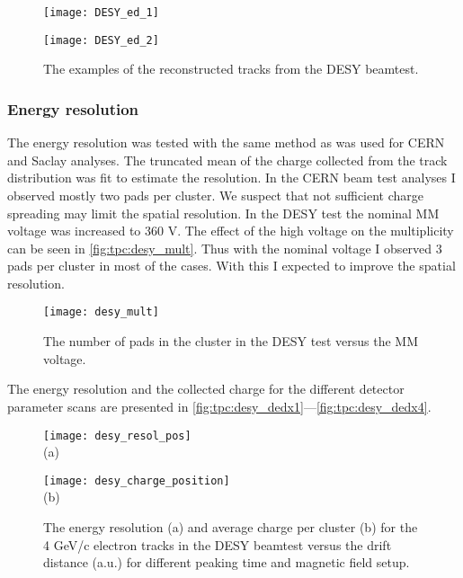 \documentclass[../main.tex]{subfiles}
\begin{document}
\begin{figure}[!ht]
  \centering
  \begin{minipage}{0.49\linewidth}
    \centering
    \texttt{[image: DESY\_ed\_1]}
  \end{minipage}
  \begin{minipage}{0.49\linewidth}
    \centering
    \texttt{[image: DESY\_ed\_2]}
  \end{minipage}
  \caption{The examples of the reconstructed tracks from the DESY beamtest.}
  \label{fig:tpc:desy_tracks}
\end{figure}

\subsubsection{Energy resolution}
The energy resolution was tested with the same method as was used for CERN and Saclay analyses. The truncated mean of the charge collected from the track distribution was fit to estimate the resolution. In the CERN beam test analyses I observed mostly two pads per cluster. We suspect that not sufficient charge spreading may limit the spatial resolution. In the DESY test the nominal MM voltage was increased to 360 V. The effect of the high voltage on the multiplicity can be seen in \autoref{fig:tpc:desy_mult}. Thus with the nominal voltage I observed 3 pads per cluster in most of the cases. With this I expected to improve the spatial resolution.

\begin{figure}[!ht]
  \centering
  \texttt{[image: desy\_mult]}
  \caption{The number of pads in the cluster in the DESY test versus the MM voltage.}
  \label{fig:tpc:desy_mult}
\end{figure}

The energy resolution and the collected charge for the different detector parameter scans are presented in \autoref{fig:tpc:desy_dedx1}---\ref{fig:tpc:desy_dedx4}.

\begin{figure}[!ht]
  \centering
  \begin{minipage}{0.49\linewidth}
    \centering
    \texttt{[image: desy\_resol\_pos]} \\ (a)
  \end{minipage}
  \begin{minipage}{0.49\linewidth}
    \centering
    \texttt{[image: desy\_charge\_position]} \\ (b)
  \end{minipage}
  \caption{The energy resolution (a) and average charge per cluster (b) for the 4 GeV/c electron tracks in the DESY beamtest versus the drift distance (a.u.) for different peaking time and magnetic field setup.}
  \label{fig:tpc:desy_dedx1}
\end{figure}
\end{document}
